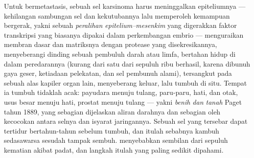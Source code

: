 \begin{definition}\label{def:b3:cancer-biology:metastasis}
Untuk bermetastasis, sebuah sel karsinoma harus meninggalkan epiteliumnya ---
kehilangan sambungan sel dan kekutubannya lalu memperoleh kemampuan bergerak,
yakni sebuah \emph{peralihan epitelium--mesenkim} yang digerakkan faktor
transkripsi yang biasanya dipakai dalam perkembangan embrio --- menguraikan
membran dasar dan matriksnya dengan protease yang disekresikannya, menyeberangi
dinding sebuah pembuluh darah atau limfa, bertahan hidup di dalam
peredarannya (kurang dari satu dari sepuluh ribu berhasil, karena dibunuh
gaya geser, ketiadaan pelekatan, dan sel pembunuh alami), tersangkut pada
sebuah alas kapiler organ lain, menyeberang keluar, lalu tumbuh di situ. Tempat
ia tumbuh tidaklah acak:  payudara menuju tulang, paru-paru, hati, dan
otak,  usus besar menuju hati,  prostat menuju tulang --- yakni
\emph{benih dan tanah} Paget tahun 1889, yang sebagian dijelaskan aliran
darahnya dan sebagian oleh kecocokan antara selnya dan isyarat jaringannya.
Sebuah sel yang tersebar dapat tertidur bertahun-tahun sebelum tumbuh, dan
itulah sebabnya  kambuh sedasawarsa sesudah tampak sembuh. 
menyebabkan sembilan dari sepuluh kematian akibat  padat, dan langkah
itulah yang paling sedikit dipahami.
\end{definition}


